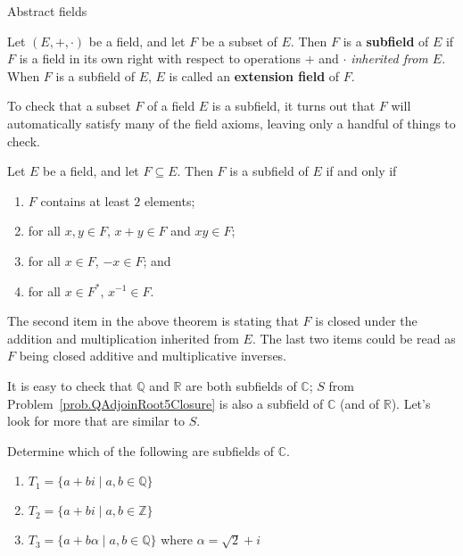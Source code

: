 \begin{section}{Abstract fields}
\begin{definition}
Let $(E,+,\cdot)$ be a field, and let $F$ be a subset of $E$. Then $F$ is a \textbf{subfield} of $E$ if $F$ is a field in its own right with respect to operations $+$ and $\cdot$ \emph{inherited from $E$}. When $F$ is a subfield of $E$, $E$ is called an \textbf{extension field} of $F$.
\end{definition}

To check that a subset $F$ of a field $E$ is a subfield, it turns out that $F$ will automatically satisfy many of the field axioms, leaving only a handful of things to check.

\begin{theorem}
Let $E$ be a field, and let $F\subseteq E$. Then $F$ is a subfield of $E$ if and only if 
\begin{enumerate}
\item $F$ contains at least $2$ elements;
\item for all $x,y\in F$, $x+y\in F$ and  $xy\in F$;
\item for all $x\in F$, $-x\in F$; and 
\item for all $x\in F^*$, $x^{-1}\in F$.
\end{enumerate}
\end{theorem}

The second item in the above theorem is stating that $F$ is closed under the addition and multiplication inherited from $E$. The last two items could be read as $F$ being closed additive and multiplicative inverses.

It is easy to check that $\mathbb{Q}$ and $\mathbb{R}$ are both subfields of $\mathbb{C}$; $S$ from Problem~\ref{prob.QAdjoinRoot5Closure} is also a subfield of $\mathbb{C}$ (and of $\mathbb{R}$). Let's look for more that are similar to $S$.

\begin{problem}\label{prob.SubfieldRoot2PlusI}
Determine which of the following are subfields of $\mathbb{C}$.
\begin{enumerate}
\item $T_1=\{a+bi\mid a,b\in \mathbb{Q}\}$
\item $T_2=\{a+bi\mid a,b\in \mathbb{Z}\}$
\item $T_3=\{a+b\alpha\mid a,b\in \mathbb{Q}\}$ where  $\alpha = \sqrt{2} + i$
\end{enumerate}
\end{problem}



\end{section}
